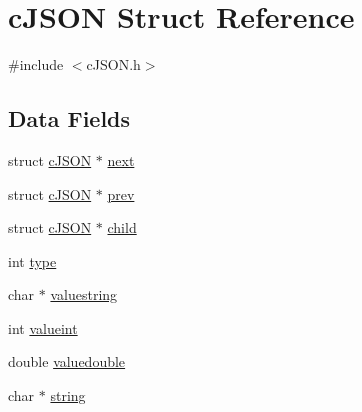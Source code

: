 \hypertarget{structc_j_s_o_n}{\section{c\-J\-S\-O\-N Struct Reference}
\label{structc_j_s_o_n}
}


{\ttfamily \#include $<$c\-J\-S\-O\-N.\-h$>$}

\subsection*{Data Fields}
\begin{DoxyCompactItemize}
\item 
struct \hyperlink{structc_j_s_o_n}{c\-J\-S\-O\-N} $\ast$ \hyperlink{structc_j_s_o_n_a91a95ab3a28ac01716663d0bdd7215f9}{next}
\item 
struct \hyperlink{structc_j_s_o_n}{c\-J\-S\-O\-N} $\ast$ \hyperlink{structc_j_s_o_n_ad8252b317903156cce35de2ea43e34dc}{prev}
\item 
struct \hyperlink{structc_j_s_o_n}{c\-J\-S\-O\-N} $\ast$ \hyperlink{structc_j_s_o_n_af3da6753e4916f328721d324d62af50d}{child}
\item 
int \hyperlink{structc_j_s_o_n_ac765329451135abec74c45e1897abf26}{type}
\item 
char $\ast$ \hyperlink{structc_j_s_o_n_a4d2b95f0dc1f37a46452f5ddd6963455}{valuestring}
\item 
int \hyperlink{structc_j_s_o_n_af69506d34291edd0be9fa15660ac01ec}{valueint}
\item 
double \hyperlink{structc_j_s_o_n_a2983295369d8ff0183638d8550a22263}{valuedouble}
\item 
char $\ast$ \hyperlink{structc_j_s_o_n_aed1cfb225a5fb77461e7972691e68a72}{string}
\end{DoxyCompactItemize}


